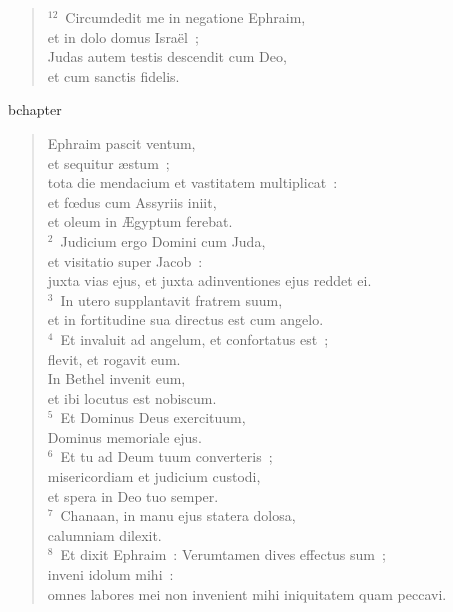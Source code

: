 \begin{flushleft}\begin{verse}${}^{12}$~Circumdedit me in negatione Ephraim,\\ et in dolo domus Isra\"el~;\\ Judas autem testis descendit cum Deo,\\ et cum sanctis fidelis.\end{verse}\end{flushleft}


bchapter\begin{flushleft}\begin{verse}\vspace{-19pt}\hspace{6pt}Ephraim pascit ventum,\\\hspace{6pt} et sequitur \ae stum~;\\ tota die mendacium et vastitatem multiplicat~:\\ et fœdus cum Assyriis iniit,\\ et oleum in \AE gyptum ferebat.\\
${}^{2}$~Judicium ergo Domini cum Juda,\\ et visitatio super Jacob~:\\ juxta vias ejus, et juxta adinventiones ejus reddet ei.\\
${}^{3}$~In utero supplantavit fratrem suum,\\ et in fortitudine sua directus est cum angelo.\\
${}^{4}$~Et invaluit ad angelum, et confortatus est~;\\ flevit, et rogavit eum.\\ In Bethel invenit eum,\\ et ibi locutus est nobiscum.\\
${}^{5}$~Et Dominus Deus exercituum,\\ Dominus memoriale ejus.\\
${}^{6}$~Et tu ad Deum tuum converteris~;\\ misericordiam et judicium custodi,\\ et spera in Deo tuo semper.\\
${}^{7}$~Chanaan, in manu ejus statera dolosa,\\ calumniam dilexit.\\
${}^{8}$~Et dixit Ephraim~: Verumtamen dives effectus sum~;\\ inveni idolum mihi~:\\ omnes labores mei non invenient mihi iniquitatem quam peccavi.\\

\end{verse}
\end{flushleft}
